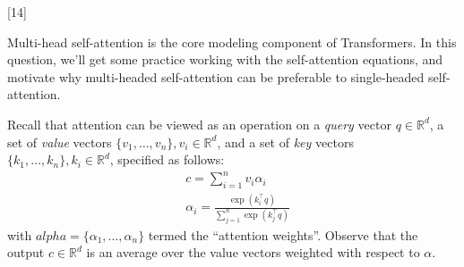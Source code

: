 \graphicspath{ {images/} }

[14]
\label{sec:analysis}

Multi-head self-attention is the core modeling component of Transformers.
In this question, we'll get some practice working with the self-attention equations, and motivate why multi-headed self-attention can be preferable to single-headed self-attention.

Recall that attention can be viewed as an operation on a \textit{query} vector $q\in\mathbb{R}^d$, a set of \textit{value} vectors $\{v_1,\dots,v_n\}, v_i\in\mathbb{R}^d$, and a set of \textit{key} vectors $\{k_1,\dots,k_n\}, k_i \in \mathbb{R}^d$, specified as follows:
\begin{align}
&c = \sum_{i=1}^{n} v_i \alpha_i \\
&\alpha_i = \frac{\exp(k_i^\top q)}{\sum_{j=1}^{n} \exp(k_j^\top q)}
\end{align} 
with $alpha = \{\alpha_1, \ldots, \alpha_n\}$ termed the ``attention weights''. 
Observe that the output $c\in\mathbb{R}^d$ is an average over the value vectors weighted with respect to $\alpha$.

